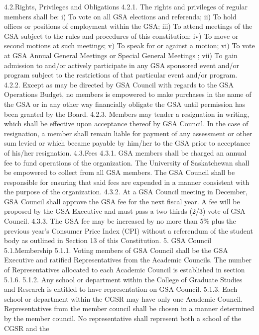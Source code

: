 \documentclass{article}
\begin{document}
4.2.Rights, Privileges and Obligations 
4.2.1. The rights and privileges of regular members shall be: 
i) To vote on all GSA elections and referenda; 
ii) To hold offices or positions of employment within the GSA; 
iii) To attend meetings of the GSA subject to the rules and procedures of 
this constitution; 
iv) To move or second motions at such meetings; 
v) To speak for or against a motion; 
vi) To vote at GSA Annual General Meetings or Special General 
Meetings ; 
vii) To gain admission to and/or actively participate in any GSA sponsored 
event and/or program subject to the restrictions of that particular event 
and/or program. 
4.2.2. Except as may be directed by GSA Council with regards to the GSA 
Operations Budget, no members is empowered to make purchases in 
the name of the GSA or in any other way financially obligate the GSA 
until permission has been granted by the Board. 
4.2.3. Members may tender a resignation in writing, which shall be effective 
upon acceptance thereof by GSA Council. In the case of resignation, a member shall remain liable for payment of any assessment or other 
sum levied or which became payable by him/her to the GSA prior to 
acceptance of his/her resignation. 
4.3.Fees 
4.3.1. GSA members shall be charged an annual fee to fund operations of the 
organization. The University of Saskatchewan shall be empowered to 
collect from all GSA members. The GSA Council shall be responsible 
for ensuring that said fees are expended in a manner consistent with 
the purpose of the organization. 
4.3.2. At a GSA Council meeting in December, GSA Council shall approve 
the GSA fee for the next fiscal year. A fee will be proposed by the 
GSA Executive and must pass a two-thirds (2/3) vote of GSA Council. 
4.3.3. The GSA fee may be increased by no more than 5\% plus the previous 
year’s Consumer Price Index (CPI) without a referendum of the 
student body as outlined in Section 13 of this Constitution. 
5. GSA Council 
5.1.Membership 
5.1.1. Voting members of GSA Council shall be the GSA Executive and 
ratified Representatives from the Academic Councils. The number of 
Representatives allocated to each Academic Council is established in 
section 5.1.6. 
5.1.2. Any school or department within the College of Graduate Studies and 
Research is entitled to have representation on GSA Council. 
5.1.3. Each school or department within the CGSR may have only one 
Academic Council. Representatives from the member council shall be 
chosen in a manner determined by the member council. No 
representative shall represent both a school of the CGSR and the 
\end{document}
